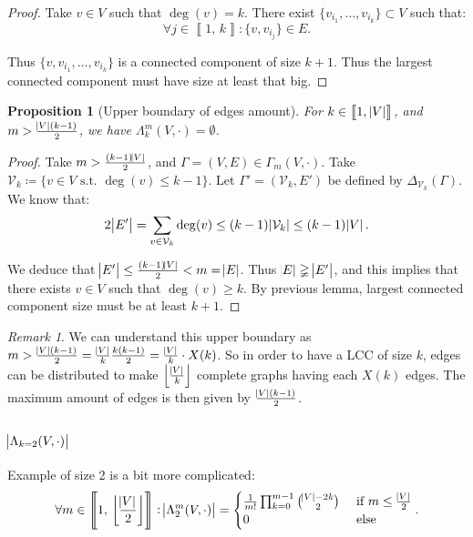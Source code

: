 \documentclass{article}
\newtheorem{proposition}[lemma]{Proposition}
\theoremstyle{definition}
\theoremstyle{remark}
\newtheorem*{remark}{Remark}
\newcommand{\intint}[2]{\left\llbracket#1, \, #2\right\rrbracket}
\newcommand{\floor}[1]{\left\lfloor#1\right\rfloor}
\newcommand{\st}{\text{ s.t. }}
\begin{document}
		\begin{proof} Take $v \in V$ such that $\deg(v) = k$. There exist $\{v_{i_1}, \ldots, v_{i_k}\} \subset V$ such that:
		\[\forall j \in \intint 1k : \{v, v_{i_j}\} \in E.\]

		Thus $\{v, v_{i_1}, \ldots, v_{i_k}\}$ is a connected component of size $k+1$. Thus the largest connected component must have size at least that big.
		\end{proof}

		\begin{proposition}[Upper boundary of edges amount]\label{proposition:upper boundary k} For $k \in \intint 1{\abs V}$, and $m > \frac {\abs V(k-1)}2$,
		we have $\Lambda_k^m(V, \cdot) = \emptyset$.
		\end{proposition}

		\begin{proof} Take $m > \frac {(k-1)\abs V}2$, and $\Gamma = (V, E) \in \Gamma_m(V, \cdot)$. Take $\mathcal V_k \coloneqq \{v \in V \st \deg(v) \leq k-1\}$.
		Let $\Gamma' = (\mathcal V_k, E')$ be defined by $\Delta_{\mathcal V_k}(\Gamma)$. We know that:
		\[2\abs {E'} = \sum_{v \in \mathcal V_k}\deg(v) \leq (k-1)\abs {\mathcal V_k} \leq (k-1)\abs V.\]

		We deduce that $\abs {E'} \leq \frac {(k-1)\abs V}2 < m = \abs E$. Thus $\abs E \gneqq \abs {E'}$, and this implies that there exists $v \in V$ such that $\deg(v) \geq k$.
		By previous lemma, largest connected component size must be at least $k+1$.
		\end{proof}

		\begin{remark} We can understand this upper boundary as $m > \frac {\abs V(k-1)}2 = \frac {\abs V}k\frac {k(k-1)}2 = \frac {\abs V}k \cdot X(k)$. So in
		order to have a LCC of size $k$, edges can be distributed to make $\floor {\frac {\abs V}k}$ complete graphs having each $X(k)$ edges.
		The maximum amount of edges is then given by $\frac {\abs V(k-1)}2$.
		\end{remark}

	\subsection{$\abs {\Lambda_{k=2}(V, \cdot)}$}
		Example of size 2 is a bit more complicated:
		\[\forall m \in \intint 1{\floor {\frac {\abs V}2}} : \abs {\Lambda_2^m(V, \cdot)} = \begin{cases}
			\frac 1{m!}\prod_{k=0}^{m-1}\binom {\abs V-2k}2 &\text{ if } m \leq \frac {\abs V}2 \\
			0 &\text{ else}
		\end{cases}.\]
\end{document}
